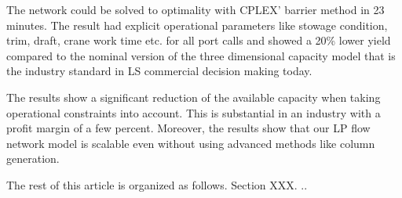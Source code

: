 The network could be solved to optimality with CPLEX' barrier method in 23 minutes. The result had explicit operational parameters like stowage condition, trim, draft, crane work time etc. for all port calls and showed a 20\% lower yield compared to the nominal version of the three dimensional capacity model that is the industry standard in LS commercial decision making today.  

The results show a significant reduction of the available capacity when taking operational constraints into account. This is substantial in an industry with a profit margin of a few percent. Moreover, the results show that our LP flow network model is scalable even without using advanced methods like column generation. 

The rest of this article is organized as follows. Section XXX. ..